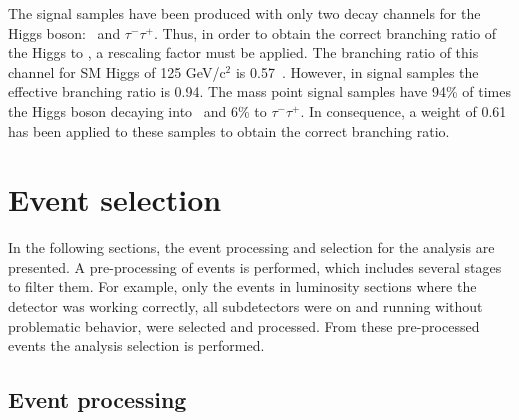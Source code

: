 The signal samples have been produced with only two decay channels for the Higgs boson: \bbbar~and $\tau^{-}\tau^{+}$. Thus, in order to obtain the correct branching ratio of the Higgs to \bbbar, a rescaling factor must be applied. The branching ratio of this channel for SM Higgs of 125 GeV/$\text{c}^{2}$ is 0.57~\cite{Heinemeyer:2013tqa}. However, in signal samples the effective branching ratio is 0.94. The mass point signal samples have 94\% of times the Higgs boson decaying into \bbbar~and 6\% to $\tau^{-}\tau^{+}$. In consequence, a weight of 0.61 has been applied to these samples to obtain the correct branching ratio. %



\section{Event selection}
\label{sec:sel}

In the following sections, the event processing and selection for the analysis are presented. A pre-processing of events is performed, which includes several stages to filter them. For example, only the events in luminosity sections where the detector was working correctly, all subdetectors were on and running without problematic behavior, were selected and processed. From these pre-processed events the analysis selection is performed.

\subsection{Event processing}


